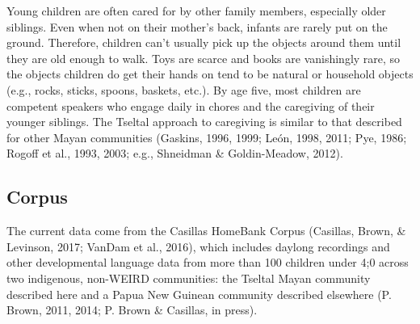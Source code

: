 \documentclass[floatsintext,man]{apa6}
\theoremstyle{definition}
\theoremstyle{definition}
\theoremstyle{definition}
\theoremstyle{remark}
\begin{document}
Young children are often cared for by other family members, especially
older siblings. Even when not on their mother's back, infants are rarely
put on the ground. Therefore, children can't usually pick up the objects
around them until they are old enough to walk. Toys are scarce and books
are vanishingly rare, so the objects children do get their hands on tend
to be natural or household objects (e.g., rocks, sticks, spoons,
baskets, etc.). By age five, most children are competent speakers who
engage daily in chores and the caregiving of their younger siblings. The
Tseltal approach to caregiving is similar to that described for other
Mayan communities (Gaskins, 1996, 1999; León, 1998, 2011; Pye, 1986;
Rogoff et al., 1993, 2003; e.g., Shneidman \& Goldin-Meadow, 2012).

\subsection{Corpus}\label{methods-corpus}

The current data come from the Casillas HomeBank Corpus (Casillas,
Brown, \& Levinson, 2017; VanDam et al., 2016), which includes daylong
recordings and other developmental language data from more than 100
children under 4;0 across two indigenous, non-WEIRD communities: the
Tseltal Mayan community described here and a Papua New Guinean community
described elsewhere (P. Brown, 2011, 2014; P. Brown \& Casillas, in
press).
\end{document}
